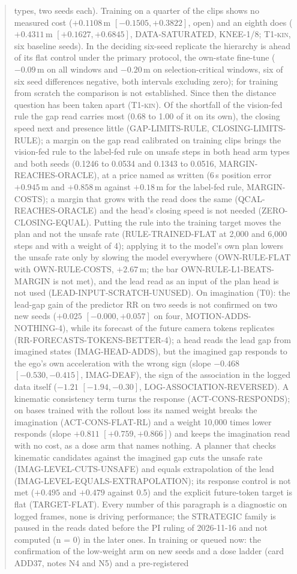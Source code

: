 \documentclass[10pt,twocolumn]{article}
\theoremstyle{remark}
\newcommand{\tier}[1]{\textsc{\small #1}}
\begin{document}
\begin{abstract}
types, two seeds each). Training on a quarter of the clips shows no measured cost ($+0.1108$\,m $[-0.1505,+0.3822]$, open) and an eighth does ($+0.4311$\,m $[+0.1627,+0.6845]$, DATA-SATURATED, KNEE-1/8; \tier{T1-kin}, six baseline seeds). In the deciding six-seed replicate the hierarchy is ahead of its flat control under the primary protocol, the own-state fine-tune ($-0.09$\,m on all windows and $-0.20$\,m on selection-critical windows, six of six seed differences negative, both intervals excluding zero); for training from scratch the comparison is not established. Since then the distance question has been taken apart (\tier{T1-kin}). Of the shortfall of the vision-fed rule the gap read carries most (0.68 to 1.00 of it on its own), the closing speed next and presence little (GAP-LIMITS-RULE, CLOSING-LIMITS-RULE); a margin on the gap read calibrated on training clips brings the vision-fed rule to the label-fed rule on unsafe steps in both head arm types and both seeds (0.1246 to 0.0534 and 0.1343 to 0.0516, MARGIN-REACHES-ORACLE), at a price named as written (6\,s position error $+0.945$\,m and $+0.858$\,m against $+0.18$\,m for the label-fed rule, MARGIN-COSTS); a margin that grows with the read does the same (QCAL-REACHES-ORACLE) and the head's closing speed is not needed (ZERO-CLOSING-EQUAL). Putting the rule into the training target moves the plan and not the unsafe rate (RULE-TRAINED-FLAT at 2,000 and 6,000 steps and with a weight of 4); applying it to the model's own plan lowers the unsafe rate only by slowing the model everywhere (OWN-RULE-FLAT with OWN-RULE-COSTS, $+2.67$\,m; the bar OWN-RULE-L1-BEATS-MARGIN is not met), and the lead read as an input of the plan head is not used (LEAD-INPUT-SCRATCH-UNUSED). On imagination (\tier{T0}): the lead-gap gain of the predictor RR on two seeds is not confirmed on two new seeds ($+0.025$ $[-0.000,+0.057]$ on four, MOTION-ADDS-NOTHING-4), while its forecast of the future camera tokens replicates (RR-FORECASTS-TOKENS-BETTER-4); a head reads the lead gap from imagined states (IMAG-HEAD-ADDS), but the imagined gap responds to the ego's own acceleration with the wrong sign (slope $-0.468$ $[-0.530,-0.415]$, IMAG-DEAF), the sign of the association in the logged data itself ($-1.21$ $[-1.94,-0.30]$, LOG-ASSOCIATION-REVERSED). A kinematic consistency term turns the response (ACT-CONS-RESPONDS); on bases trained with the rollout loss its named weight breaks the imagination (ACT-CONS-FLAT-RL) and a weight 10,000 times lower responds (slope $+0.811$ $[+0.759,+0.866]$) and keeps the imagination read with no cost, as a dose arm that names nothing. A planner that checks kinematic candidates against the imagined gap cuts the unsafe rate (IMAG-LEVEL-CUTS-UNSAFE) and equals extrapolation of the lead (IMAG-LEVEL-EQUALS-EXTRAPOLATION); its response control is not met ($+0.495$ and $+0.479$ against 0.5) and the explicit future-token target is flat (TARGET-FLAT). Every number of this paragraph is a diagnostic on logged frames, none is driving performance; the STRATEGIC family is paused in the reads dated before the PI ruling of 2026-11-16 and not computed (n = 0) in the later ones. In training or queued now: the confirmation of the low-weight arm on new seeds and a dose ladder (card ADD37, notes N4 and N5) and a pre-registered 
\end{abstract}
\end{document}
